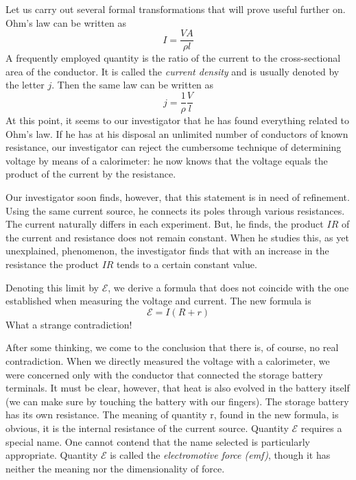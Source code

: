 Let us carry out several formal transformations that will prove useful further on. Ohm's law can be written as
\begin{equation*}%
I = \frac{VA}{\rho l}
\end{equation*}
A frequently employed quantity is the ratio of the current to the cross-sectional area of the conductor. It is called the \emph{current density} and is usually denoted by the letter $j$. Then the same law can be written as
\begin{equation*}%
j = \frac{1}{\rho} \frac{V}{l}
\label{curr-density}
\end{equation*}
At this point, it seems to our investigator that he has found everything related to Ohm's law. If he has at his disposal an unlimited number of conductors of known resistance, our investigator can reject the cumbersome technique of determining voltage by means of a calorimeter: he now knows that the voltage equals the product of the current by the resistance.

Our investigator soon finds, however, that this statement is in need of refinement. Using the same current source, he connects its poles through various resistances. The current naturally differs in each experiment. But, he finds, the product $IR$ of the current and resistance does not remain constant. When he studies this, as yet unexplained, phenomenon, the investigator finds that with an increase in the resistance the product $IR$ tends to a certain constant value.

Denoting this limit by $\mathcal{E}$, we derive a formula that does not coincide with the one established when measuring the voltage and current. The new formula is
\begin{equation*}%
\mathcal{E} = I (R + r)
\end{equation*}
What a strange contradiction!

After some thinking, we come to the conclusion that there is, of course, no real contradiction. When we directly measured the voltage with a calorimeter, we were concerned only with the conductor that connected the storage battery terminals. It must be clear, however, that heat is also evolved in the battery itself (we can make sure by touching the battery with our fingers). The storage battery has its own resistance. The meaning of quantity r, found in the new formula, is obvious, it is the internal resistance of the current source. Quantity $\mathcal{E}$ requires a special name. One cannot contend that the name selected is particularly appropriate. Quantity $\mathcal{E}$ is called the \emph{electromotive force (emf)}, though it has neither the meaning nor the dimensionality of force.


